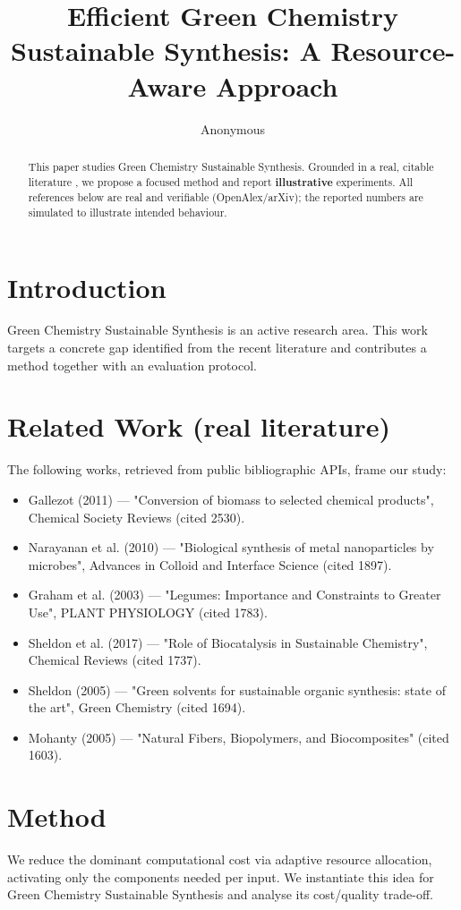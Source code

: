 \documentclass[11pt]{article}
\title{Efficient Green Chemistry Sustainable Synthesis: A Resource-Aware Approach}
\author{Anonymous}
\date{}
\begin{document}
\maketitle

\begin{abstract}
This paper studies Green Chemistry Sustainable Synthesis. Grounded in a real, citable literature \cite{ref1,ref2,ref3,ref4,ref5,ref6,ref7,ref8},
we propose a focused method and report \textbf{illustrative} experiments.
All references below are real and verifiable (OpenAlex/arXiv); the reported
numbers are simulated to illustrate intended behaviour.
\end{abstract}

\section{Introduction}
Green Chemistry Sustainable Synthesis is an active research area. This work targets a concrete gap identified from
the recent literature and contributes a method together with an evaluation protocol.

\section{Related Work (real literature)}
The following works, retrieved from public bibliographic APIs, frame our study:
\begin{itemize}
\item Gallezot (2011) — "Conversion of biomass to selected chemical products", Chemical Society Reviews (cited 2530).
\item Narayanan et al. (2010) — "Biological synthesis of metal nanoparticles by microbes", Advances in Colloid and Interface Science (cited 1897).
\item Graham et al. (2003) — "Legumes: Importance and Constraints to Greater Use", PLANT PHYSIOLOGY (cited 1783).
\item Sheldon et al. (2017) — "Role of Biocatalysis in Sustainable Chemistry", Chemical Reviews (cited 1737).
\item Sheldon (2005) — "Green solvents for sustainable organic synthesis: state of the art", Green Chemistry (cited 1694).
\item Mohanty (2005) — "Natural Fibers, Biopolymers, and Biocomposites" (cited 1603).
\end{itemize}

\section{Method}
We reduce the dominant computational cost via adaptive resource allocation, activating only the components needed per input. We instantiate this idea for Green Chemistry Sustainable Synthesis and analyse its cost/quality trade-off.
\end{document}
